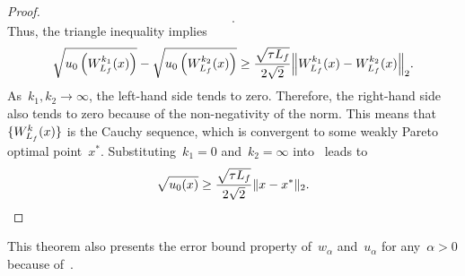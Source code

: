 \documentclass[../main]{subfiles}
\begin{document}
\begin{proof}
\begin{equation}
    .\end{equation}
    Thus, the triangle inequality implies
    \begin{equation} \label{eq:proximal_PL_MO_EB:sq_gap_Cauchy}
        \sqrt{u_0\left(W_{L_f}^{k_1}(x)\right)} - \sqrt{u_0\left(W_{L_f}^{k_2}(x)\right)} \ge \frac{\sqrt{\tau L_f}}{2 \sqrt{2}} \norm*{W_{L_f}^{k_1}(x) - W_{L_f}^{k_2}(x)}_2
    .\end{equation}
    As~$k_1, k_2 \to \infty$, the left-hand side tends to zero.
    Therefore, the right-hand side also tends to zero because of the non-negativity of the norm.
    This means that~$\lbrace W_{L_f}^k(x)\rbrace$ is the Cauchy sequence, which is convergent to some weakly Pareto optimal point~$x^*$.
    Substituting~$k_1 = 0$ and~$k_2 = \infty$ into~ leads to
    \begin{equation}
        \sqrt{u_0(x)} \ge \frac{\sqrt{\tau L_f}}{2 \sqrt{2}} \lVert x - x^*\rVert_2
    .\end{equation}
\end{proof}
This theorem also presents the error bound property of~$w_\alpha$ and~$u_\alpha$ for any~$\alpha > 0$ because of~.
\end{document}

